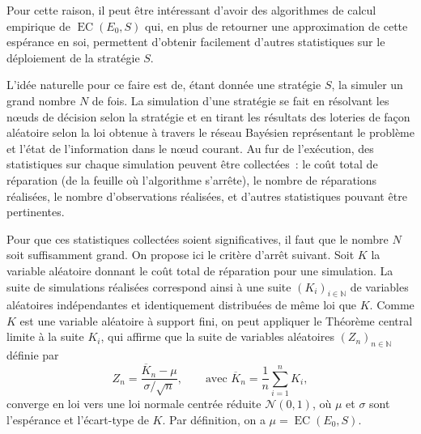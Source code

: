 \documentclass[a4paper,11pt]{article}
\theoremstyle{plain}
\theoremstyle{definition}
\DeclareMathOperator{\EC}{EC}
\begin{document}
Pour cette raison, il peut être intéressant d'avoir des algorithmes de calcul empirique de $\EC(E_0, S)$ qui, en plus de retourner une approximation de cette espérance en soi, permettent d'obtenir facilement d'autres statistiques sur le déploiement de la stratégie $S$.

L'idée naturelle pour ce faire est de, étant donnée une stratégie $S$, la simuler un grand nombre $N$ de fois. La simulation d'une stratégie se fait en résolvant les nœuds de décision selon la stratégie et en tirant les résultats des loteries de façon aléatoire selon la loi obtenue à travers le réseau Bayésien représentant le problème et l'état de l'information dans le nœud courant. Au fur de l'exécution, des statistiques sur chaque simulation peuvent être collectées~: le coût total de réparation (de la feuille où l'algorithme s'arrête), le nombre de réparations réalisées, le nombre d'observations réalisées, et d'autres statistiques pouvant être pertinentes.

Pour que ces statistiques collectées soient significatives, il faut que le nombre $N$ soit suffisamment grand. On propose ici le critère d'arrêt suivant. Soit $K$ la variable aléatoire donnant le coût total de réparation pour une simulation. La suite de simulations réalisées correspond ainsi à une suite $(K_i)_{i \in \mathbb N}$ de variables aléatoires indépendantes et identiquement distribuées de même loi que $K$. Comme $K$ est une variable aléatoire à support fini, on peut appliquer le Théorème central limite à la suite $K_i$, qui affirme que la suite de variables aléatoires $(Z_n)_{n \in \mathbb N}$ définie par
\[
Z_n = \frac{\overline K_n - \mu}{\sigma / \sqrt{n}}, \qquad \text{avec } \overline K_n = \frac{1}{n} \sum_{i=1}^n K_i,
\]
converge en loi vers une loi normale centrée réduite $\mathcal N(0, 1)$, où $\mu$ et $\sigma$ sont l'espérance et l'écart-type de $K$. Par définition, on a $\mu = \EC(E_0, S)$.
\end{document}
